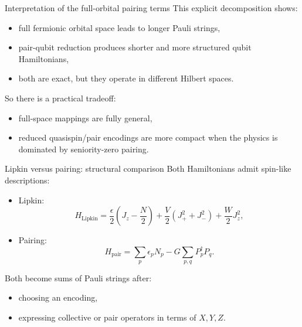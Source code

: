 \documentclass[aspectratio=169]{beamer}
\begin{document}
\begin{frame}{Interpretation of the full-orbital pairing terms}
This explicit decomposition shows:
\begin{itemize}
\item full fermionic orbital space leads to longer Pauli strings,
\item pair-qubit reduction produces shorter and more structured qubit Hamiltonians,
\item both are exact, but they operate in different Hilbert spaces.
\end{itemize}

So there is a practical tradeoff:
\begin{itemize}
\item full-space mappings are fully general,
\item reduced quasispin/pair encodings are more compact when the physics is dominated by seniority-zero pairing.
\end{itemize}
\end{frame}

\begin{frame}{Lipkin versus pairing: structural comparison}
Both Hamiltonians admit spin-like descriptions:
\begin{itemize}
\item Lipkin:
\[
H_{\mathrm{Lipkin}}
=
\frac{\epsilon}{2}\left(J_z-\frac{N}{2}\right)
+\frac{V}{2}(J_+^2+J_-^2)
+\frac{W}{2}J_z^2,
\]
\item Pairing:
\[
H_{\mathrm{pair}}
=
\sum_p \epsilon_p N_p - G\sum_{p,q} P_p^\dagger P_q.
\]
\end{itemize}

Both become sums of Pauli strings after:
\begin{itemize}
\item choosing an encoding,
\item expressing collective or pair operators in terms of \(X,Y,Z\).
\end{itemize}
\end{frame}
\end{document}
